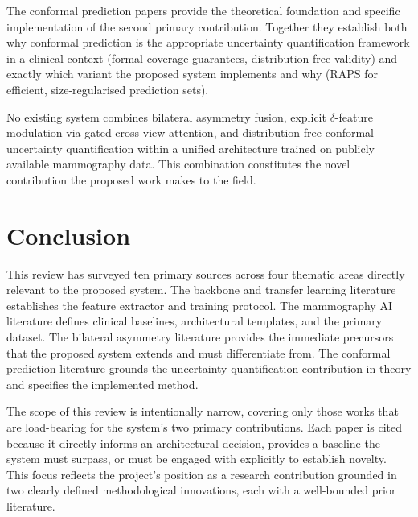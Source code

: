\documentclass[12pt, a4paper]{article}
\begin{document}
The conformal prediction papers \parencite{Angelopoulos2021, Romano2020}
provide the theoretical foundation and specific implementation of the
second primary contribution.
Together they establish both why conformal prediction is the appropriate
uncertainty quantification framework in a clinical context (formal
coverage guarantees, distribution-free validity) and exactly which
variant the proposed system implements and why (RAPS for efficient,
size-regularised prediction sets).

No existing system combines bilateral asymmetry fusion, explicit
$\delta$-feature modulation via gated cross-view attention, and
distribution-free conformal uncertainty quantification within a unified
architecture trained on publicly available mammography data.
This combination constitutes the novel contribution the proposed work
makes to the field.

\section{Conclusion}

This review has surveyed ten primary sources across four thematic areas
directly relevant to the proposed system.
The backbone and transfer learning literature establishes the feature
extractor and training protocol.
The mammography AI literature defines clinical baselines, architectural
templates, and the primary dataset.
The bilateral asymmetry literature provides the immediate precursors that
the proposed system extends and must differentiate from.
The conformal prediction literature grounds the uncertainty quantification
contribution in theory and specifies the implemented method.

The scope of this review is intentionally narrow, covering only those
works that are load-bearing for the system's two primary contributions.
Each paper is cited because it directly informs an architectural decision,
provides a baseline the system must surpass, or must be engaged with
explicitly to establish novelty.
This focus reflects the project's position as a research contribution
grounded in two clearly defined methodological innovations, each with
a well-bounded prior literature.

\newpage
\printbibliography[title={References}]
\end{document}
